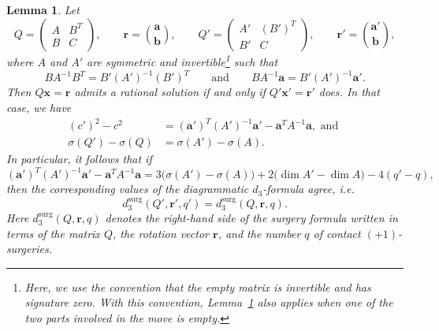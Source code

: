 \documentclass{amsart}
\numberwithin{equation}{section}
\numberwithin{figure}{section}
\newtheorem{lemma}[theorem]{Lemma}
\theoremstyle{definition}
\theoremstyle{remark}
\begin{document}
\begin{lemma}\label{lem:Schur_local}
Let
\[
Q=\begin{pmatrix} A & B^T \\ B & C \end{pmatrix},
\qquad
\boldsymbol r=\binom{\boldsymbol a}{\boldsymbol b},
\qquad
Q'=\begin{pmatrix} A' & (B')^T \\ B' & C \end{pmatrix},
\qquad
\boldsymbol r'=\binom{\boldsymbol a'}{\boldsymbol b},
\]
where \(A\) and \(A'\) are symmetric and invertible\footnote{Here, we use the convention that the empty matrix is invertible and has signature zero. With this convention, Lemma~\ref{lem:Schur_local} also applies when one of the two parts involved in the move is empty.} such that
\[
B A^{-1} B^T = B'(A')^{-1}(B')^T
\qquad\text{and}\qquad
B A^{-1}\boldsymbol a = B'(A')^{-1}\boldsymbol a'.
\]
Then \(Q\boldsymbol x=\boldsymbol r\) admits a rational solution if and only if \(Q'\boldsymbol x'=\boldsymbol r'\) does. In that case, we have
\begin{align*}
    (c')^2-c^2 &= (\boldsymbol a')^T(A')^{-1}\boldsymbol a' - \boldsymbol a^TA^{-1}\boldsymbol a, \textrm{ and }\\
\sigma(Q')-\sigma(Q) &=\sigma(A')-\sigma(A).
\end{align*}
In particular, it follows that if
\[
(\boldsymbol a')^T(A')^{-1}\boldsymbol a'
-
\boldsymbol a^TA^{-1}\boldsymbol a
=
3\bigl(\sigma(A')-\sigma(A)\bigr)
+
2\bigl(\operatorname{dim} A'-\operatorname{dim} A\bigr)
-
4(q'-q),
\]
then the corresponding values of the diagrammatic \(d_3\)-formula agree, i.e.\
\[
d_3^{\mathrm{surg}}(Q',\boldsymbol r',q')
=
d_3^{\mathrm{surg}}(Q,\boldsymbol r,q).
\]
Here \(d_3^{\mathrm{surg}}(Q,\boldsymbol r,q)\) denotes the right-hand side of the surgery formula written in terms of the matrix \(Q\), the rotation vector \(\boldsymbol r\), and the number \(q\) of contact \((+1)\)-surgeries.
\end{lemma}
\end{document}
